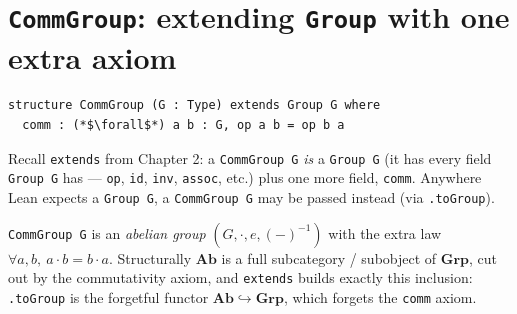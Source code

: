 \section{\texorpdfstring{\texttt{CommGroup}: extending \texttt{Group} with one extra axiom}{CommGroup: extending Group with one extra axiom}}\label{sec:08-rings:02-comm-group:1}

\begin{lstlisting}
structure CommGroup (G : Type) extends Group G where
  comm : (*$\forall$*) a b : G, op a b = op b a
\end{lstlisting}

Recall \texttt{extends} from Chapter 2: a \texttt{CommGroup G} \emph{is} a \texttt{Group G} (it has every field \texttt{Group G} has --- \texttt{op}, \texttt{id}, \texttt{inv}, \texttt{assoc}, etc.) plus one more field, \texttt{comm}. Anywhere Lean expects a \texttt{Group G}, a \texttt{CommGroup G} may be passed instead (via \texttt{.toGroup}).

\begin{mathreading}

\texttt{CommGroup G} is an \emph{abelian group} \((G, \cdot, e, (-)^{-1})\) with the extra law \(\forall a,b,\ a\cdot b = b\cdot a\). Structurally \(\mathbf{Ab}\) is a full subcategory / subobject of \(\mathbf{Grp}\), cut out by the commutativity axiom, and \texttt{extends} builds exactly this inclusion: \texttt{.toGroup} is the forgetful functor \(\mathbf{Ab} \hookrightarrow \mathbf{Grp}\), which forgets the \texttt{comm} axiom.

\end{mathreading}
